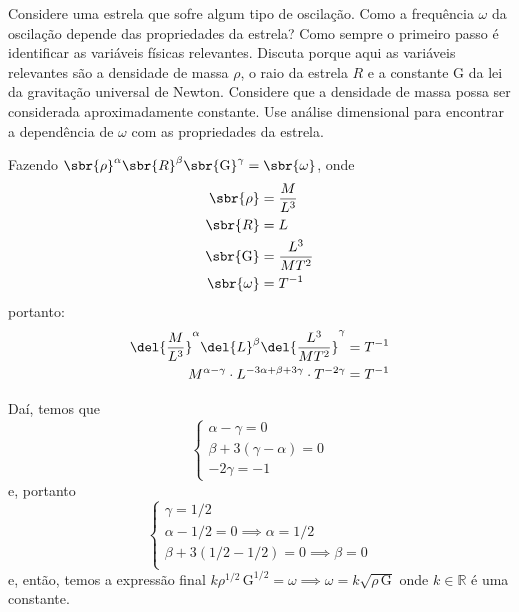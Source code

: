 \documentclass[]{IMTexam}
\begin{document}
\begin{questions}
	\question

	Considere uma estrela que sofre algum tipo de oscilação. Como a frequência $ \omega $ da oscilação depende das propriedades da estrela?
	Como sempre o primeiro passo é identificar as variáveis físicas relevantes.
	Discuta porque aqui as variáveis relevantes são a densidade de massa $ \rho $, o raio da estrela $ R $ e a constante $ \mathrm{G} $ da lei da gravitação universal de Newton.
	Considere que a densidade de massa possa ser considerada aproximadamente constante. Use análise dimensional para encontrar a dependência de $ \omega $ com as propriedades da estrela.

	\begin{solution}

		\begin{multi}
			Fazendo $ \sbr{\rho}^{\alpha} \sbr{R}^{\beta} \sbr{\mathrm{G}}^{\gamma}=\sbr{\omega} $, onde
			\begin{align*}
				\sbr{\rho}       & =\dfrac{M}{L^{3}}      \\
				\sbr{R}          & =L                     \\
				\sbr{\mathrm{G}} & =\dfrac{L^{3}}{MT^{2}} \\
				\sbr{\omega}     & =T^{-1}
			\end{align*}
			portanto: \begin{align*}
				\del{\dfrac{M}{L^{3}}}^{\alpha}\del{L}^{\beta}\del{\dfrac{L^{3}}{MT^{2}}}^{\gamma} & =T^{-1} \\
				M^{\alpha-\gamma}\cdot L^{-3\alpha+\beta+3\gamma}\cdot T^{-2\gamma}                & =T^{-1}
			\end{align*}

			\nextcol

			Daí, temos que
			\[ \begin{cases}
					\alpha-\gamma=0          \\
					\beta+3(\gamma-\alpha)=0 \\
					-2\gamma=-1
				\end{cases} \]
			e, portanto
			\[ \begin{cases}
					\gamma=1/2                        \\
					\alpha-1/2=0\implies\alpha=1/2    \\
					\beta+3(1/2-1/2)=0\implies\beta=0 \\
				\end{cases} \]
			e, então, temos a expressão final $ k\rho^{1/2}\,\mathrm{G}^{1/2}=\omega\implies \omega=k\sqrt{\rho\,\mathrm{G}} $ onde $ k\in\mathbb{R} $ é uma constante.
		\end{multi}
	\end{solution}


\end{questions}
\end{document}
